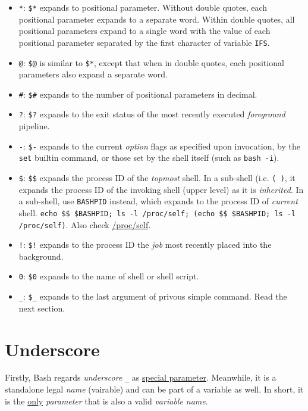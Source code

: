 \begin{itemize}
\item \verb|*|: \lstinline|$*| expands to positional
  parameter. Without double quotes, each positional parameter
  expands to a separate word. Within double quotes, all positional
  parameters expand to a single word with the value of each
  positional parameter separated by the first character of
  variable \lstinline|IFS|.
\item \verb|@|: \lstinline|$@| is similar to \lstinline|$*|,
  except that when in double quotes, each positional parameters
  also expand a separate word.
\item \verb|#|: \lstinline|$#| expands to the number of positional
  parameters in decimal.
\item \verb|?|: \lstinline|$?| expands to the exit status of the
  most recently executed \textit{foreground} pipeline.
\item \verb|-|: \lstinline|$-| expands to the current
  \textit{option} flags as specified upon invocation, by the
  \lstinline|set| builtin command, or those set by the shell
  itself (such as \lstinline|bash -i|).
\item \verb|$|: \lstinline|$$| expands the process ID of the
  \textit{topmost} shell. In a sub-shell (i.e. \lstinline|( )|, it
  expands the process ID of the invoking shell (upper level) as it
  is \textit{inherited}. In a sub-shell, use \lstinline|BASHPID|
  instead, which expands to the process ID of \textit{current}
  shell.
  \lstinline|echo $$ $BASHPID; ls -l /proc/self; (echo $$ $BASHPID; ls -l /proc/self)|.
  Also check
  \href{https://unix.stackexchange.com/a/333227}{/proc/self}.
\item \verb|!|: \lstinline|$!| expands to the process ID the
  \textit{job} most recently placed into the background.
\item \verb|0|: \lstinline|$0| expands to the name of shell or
  shell script.
\item \verb|_|: \lstinline|$_| expands to the last argument of
  privous simple command. Read the next section.
\end{itemize}

\section{Underscore}
\label{sec:bash-underscore}

Firstly, Bash regards \textit{underscore} \lstinline|_| as
\href{https://www.gnu.org/software/bash/manual/bash.html#Special-Parameters}{special
  parameter}. Meanwhile, it is a standalone legal \textit{name}
(vairable) and can be part of a variable as well. In short, it is
the \uline{only} \textit{parameter} that is also a valid
\textit{variable name}.


